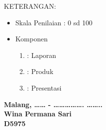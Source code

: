 KETERANGAN:
\begin{itemize}
	\item Skala Penilaian : 0 sd 100
	\item Komponen \begin{enumerate}
		\item : Laporan
		\item : Produk
		\item : Presentasi
	\end{enumerate}
\end{itemize}
\vspace{1.2cm}
\begin{center}
	\textbf{Malang, …… - ……………. …….. }\\
	\vfill
	\textbf{Wina Permana Sari }\\
	\textbf{D5975}
\end{center}
\egroup